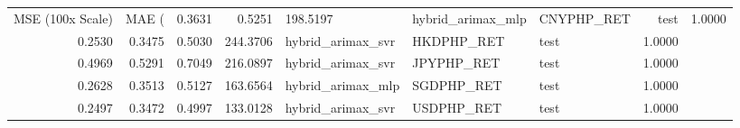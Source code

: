 \begin{tabular}{rrrrlllr}
\toprule
MSE (100x Scale) & MAE (%
 & 0.3631 & 0.5251 & 198.5197 & hybrid_arimax_mlp & CNYPHP_RET & test & 1.0000 \\
0.2530 & 0.3475 & 0.5030 & 244.3706 & hybrid_arimax_svr & HKDPHP_RET & test & 1.0000 \\
0.4969 & 0.5291 & 0.7049 & 216.0897 & hybrid_arimax_svr & JPYPHP_RET & test & 1.0000 \\
0.2628 & 0.3513 & 0.5127 & 163.6564 & hybrid_arimax_mlp & SGDPHP_RET & test & 1.0000 \\
0.2497 & 0.3472 & 0.4997 & 133.0128 & hybrid_arimax_svr & USDPHP_RET & test & 1.0000 \\
\bottomrule
\end{tabular}
